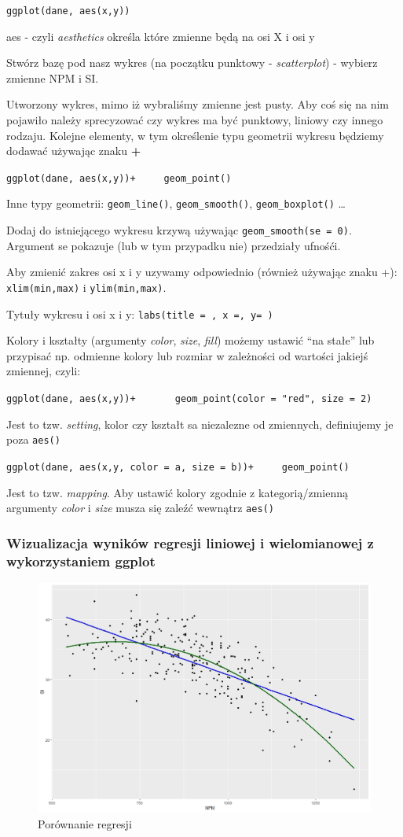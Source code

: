 \documentclass[]{article}
\begin{document}
\texttt{ggplot(dane,\ aes(x,y))}

aes - czyli \emph{aesthetics} określa które zmienne będą na osi X i osi
y

Stwórz bazę pod nasz wykres (na początku punktowy - \emph{scatterplot})
- wybierz zmienne NPM i SI.

Utworzony wykres, mimo iż wybraliśmy zmienne jest pusty. Aby coś się na
nim pojawiło należy sprecyzować czy wykres ma być punktowy, liniowy czy
innego rodzaju. Kolejne elementy, w tym określenie typu geometrii
wykresu będziemy dodawać używając znaku \textbf{+}

\texttt{ggplot(dane,\ aes(x,y))+\ \ \ \ \ geom\_point()}

Inne typy geometrii: \texttt{geom\_line()}, \texttt{geom\_smooth()},
\texttt{geom\_boxplot()} \ldots{}

Dodaj do istniejącego wykresu krzywą używając
\texttt{geom\_smooth(se\ =\ 0)}. Argument se pokazuje (lub w tym
przypadku nie) przedziały ufnośći.

Aby zmienić zakres osi x i y uzywamy odpowiednio (również używając znaku
+): \texttt{xlim(min,max)} i \texttt{ylim(min,max)}.

Tytuły wykresu i osi x i y: \texttt{labs(title\ =\ ,\ x\ =,\ y=\ )}

Kolory i kształty (argumenty \emph{color}, \emph{size}, \emph{fill})
możemy ustawić ``na stałe'' lub przypisać np. odmienne kolory lub
rozmiar w zależności od wartości jakiejś zmiennej, czyli:

\texttt{ggplot(dane,\ aes(x,y))+\ \ \ \ \ \ \ geom\_point(color\ =\ "red",\ size\ =\ 2)}

Jest to tzw. \emph{setting}, kolor czy kształt sa niezalezne od
zmiennych, definiujemy je poza \texttt{aes()}

\texttt{ggplot(dane,\ aes(x,y,\ color\ =\ a,\ size\ =\ b))+\ \ \ \ \ geom\_point()}

Jest to tzw. \emph{mapping}. Aby ustawić kolory zgodnie z
kategorią/zmienną argumenty \emph{color} i \emph{size} musza się zaleźć
wewnątrz \texttt{aes()}

\subsubsection{Wizualizacja wyników regresji liniowej i wielomianowej z
wykorzystaniem
ggplot}\label{wizualizacja-wynikow-regresji-liniowej-i-wielomianowej-z-wykorzystaniem-ggplot}

\begin{figure}
\centering
\includegraphics{REGRESJA.jpeg}
\caption{Porównanie regresji}
\end{figure}
\end{document}
